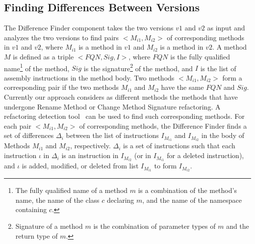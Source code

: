\subsection{Finding Differences Between Versions}
The Difference Finder component takes the two versions $v1$ and $v2$ as input and analyzes the two versions to find pairs $<$$M_{i1}, M_{i2}$$>$ of corresponding methods in $v1$ and $v2$, where $M_{i1}$ is a method in $v1$ and $M_{i2}$ is a method in $v2$. A method $M$ is defined as a triple $<$$FQN, Sig, I$$>$, where $FQN$ is the fully qualified name\footnote{\scriptsize{The fully qualified name of a method $m$ is a combination of the method's name, the name of the class $c$ declaring $m$, and the name of the namespace containing $c$.}} of the method, $Sig$ is the signature\footnote{\scriptsize{Signature of a method $m$ is the combination of parameter types of $m$ and the return type of $m$.}} of the method, and $I$ is the list of assembly instructions in the method body. Two methods $<$$M_{i1}, M_{i2}$$>$ form a  corresponding pair if the two methods $M_{i1}$ and $M_{i2}$ have the same $FQN$ and $Sig$. Currently our approach considers as different methods the methods that have undergone Rename Method or Change Method Signature refactoring. A refactoring detection tool~\cite{Dig'06:ECOOP} can be used to find such corresponding methods. For each pair $<$$M_{i1}, M_{i2}$$>$ of corresponding methods, the Difference Finder finds a set of  differences $\Delta_i$ between the list of instructions $I_{M_{i1}}$ and $I_{M_{i2}}$ in the body of Methods $M_{i1}$ and $M_{i2}$, respectively. $\Delta_i$ is a set of instructions such that each instruction $\iota$ in $\Delta_i$ is an instruction in $I_{M_{i2}}$ (or in $I_{M_{i1}}$ for a deleted instruction), and $\iota$ is added, modified, or deleted from list $I_{M_{i1}}$ to form $I_{M_{i2}}$.
%   
